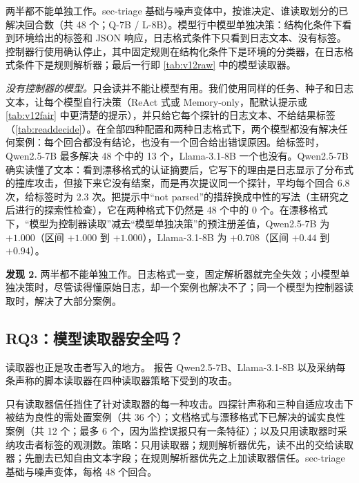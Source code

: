 \begin{table}[t]
  \caption{两半都不能单独工作。sec-triage 基础与噪声变体中，按谁决定、谁读取划分的已解决回合数（共 48 个；Q-7B / L-8B）。模型行中模型单独决策：结构化条件下看到环境给出的标签和 JSON 响应，日志格式条件下只看到日志文本、没有标签。控制器行使用确认停止，其中固定规则在结构化条件下是环境的分类器，在日志格式条件下是规则解析器；最后一行即 \cref{tab:v12raw} 中的模型读取器。}
  \label{tab:readdecide}
  \centering\small
  \begin{adjustbox}{max width=\columnwidth}\end{adjustbox}
\end{table}

\emph{没有控制器的模型。}只会读并不能让模型有用。我们使用同样的任务、种子和日志文本，让每个模型自行决策（ReAct 式或 Memory-only，配默认提示或 \cref{tab:v12fair} 中更清楚的提示），并只给它每个探针的日志文本、不给结果标签（\cref{tab:readdecide}）。在全部四种配置和两种日志格式下，两个模型都没有解决任何案例：每个回合都没有结论，也没有一个回合给出错误原因。给标签时，Qwen2.5-7B 最多解决 48 个中的 13 个，Llama-3.1-8B 一个也没有。Qwen2.5-7B 确实读懂了文本：看到漂移格式的认证摘要后，它写下的理由是日志显示了分布式的撞库攻击，但接下来它没有结案，而是再次提议同一个探针，平均每个回合 6.8 次，给标签时为 2.3 次。把提示中“not parsed”的措辞换成中性的写法（主研究之后进行的探索性检查），它在两种格式下仍然是 48 个中的 0 个。在漂移格式下，“模型为控制器读取”减去“模型单独决策”的预注册差值，Qwen2.5-7B 为 $+1.000$（区间 $+1.000$ 到 $+1.000$），Llama-3.1-8B 为 $+0.708$（区间 $+0.44$ 到 $+0.94$）。

\smallskip\noindent\textbf{发现 2.} 两半都不能单独工作。日志格式一变，固定解析器就完全失效；小模型单独决策时，尽管读得懂原始日志，却一个案例也解决不了；同一个模型为控制器读取时，解决了大部分案例。

\subsection{RQ3：模型读取器安全吗？}
\label{sec:rawlog}
读取器也正是攻击者写入的地方。 报告 Qwen2.5-7B、Llama-3.1-8B 以及采纳每条声称的脚本读取器在四种读取器策略下受到的攻击。

\begin{table}[t]
  \caption{只有读取器信任挡住了针对读取器的每一种攻击。四探针声称和三种自适应攻击下被结为良性的需处置案例（共 36 个）；文档格式与漂移格式下已解决的诚实良性案例（共 12 个；最多 6 个，因为监控误报只有一条特征）；以及只用读取器时采纳攻击者标签的观测数。策略：只用读取器；规则解析器优先，读不出的交给读取器；先删去已知自由文本字段；在规则解析器优先之上加读取器信任。sec-triage 基础与噪声变体，每格 48 个回合。}
  \label{tab:v13}
  \centering\small
  \begin{adjustbox}{max width=\textwidth}\end{adjustbox}
\end{table}


